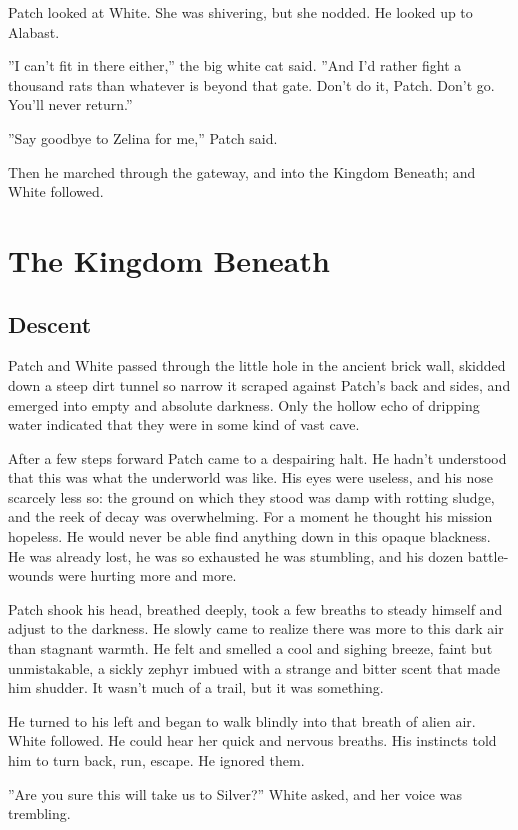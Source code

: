 \documentclass[12pt]{book}
\begin{document}
Patch looked at White. She was shivering, but she nodded. He looked up to Alabast.

''I can't fit in there either,'' the big white cat said. ''And I'd rather fight a thousand rats than whatever is beyond that gate. Don't do it, Patch. Don't go. You'll never return.''

''Say goodbye to Zelina for me,'' Patch said.

Then he marched through the gateway, and into the Kingdom Beneath; and White followed.


\chapter{The Kingdom Beneath}

\section{Descent}

Patch and White passed through the little hole in the ancient brick wall, skidded down a steep dirt tunnel so narrow it scraped against Patch's back and sides, and emerged into empty and absolute darkness. Only the hollow echo of dripping water indicated that they were in some kind of vast cave.

After a few steps forward Patch came to a despairing halt. He hadn't understood that this was what the underworld was like. His eyes were useless, and his nose scarcely less so: the ground on which they stood was damp with rotting sludge, and the reek of decay was overwhelming. For a moment he thought his mission hopeless. He would never be able find anything down in this opaque blackness. He was already lost, he was so exhausted he was stumbling, and his dozen battle-wounds were hurting more and more. 

Patch shook his head, breathed deeply, took a few breaths to steady himself and adjust to the darkness. He slowly came to realize there was more to this dark air than stagnant warmth. He felt and smelled a cool and sighing breeze, faint but unmistakable, a sickly zephyr imbued with a strange and bitter scent that made him shudder. It wasn't much of a trail, but it was something.

He turned to his left and began to walk blindly into that breath of alien air. White followed. He could hear her quick and nervous breaths. His instincts told him to turn back, run, escape. He ignored them.

''Are you sure this will take us to Silver?'' White asked, and her voice was trembling.
\end{document}
